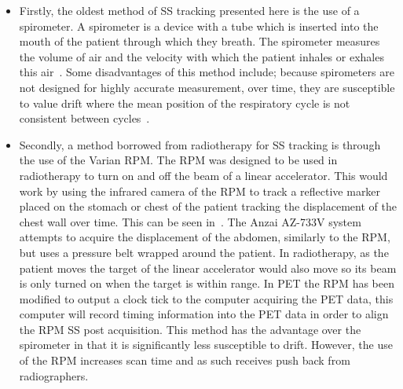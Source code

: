                 \begin{itemize}
                    \item Firstly, the oldest method of \gls{SS} tracking presented here is the use of a spirometer. A spirometer is a device with a tube which is inserted into the mouth of the patient through which they breath. The spirometer measures the volume of air and the velocity with which the patient inhales or exhales this air~. Some disadvantages of this method include; %
                    because spirometers are not designed for highly accurate measurement, over time, they are susceptible to value drift where the mean position of the respiratory cycle is not consistent between cycles~.
                    
                    \item Secondly, a method borrowed from radiotherapy for \gls{SS} tracking is through the use of the Varian \gls{RPM}. The \gls{RPM} was designed to be used in radiotherapy to turn on and off the beam of a linear accelerator. This would work by using the infrared camera of the \gls{RPM} to track a reflective marker placed on the stomach or chest of the patient tracking the displacement of the chest wall over time. This can be seen in~. The Anzai AZ-733V system attempts to acquire the displacement of the abdomen, similarly to the \gls{RPM}, but uses a pressure belt wrapped around the patient. In radiotherapy, as the patient moves the target of the linear accelerator would also move so its beam is only turned on when the target is within range. In \gls{PET} the \gls{RPM} has been modified to output a clock tick to the computer acquiring the \gls{PET} data, this computer will %
                    record timing information into the \gls{PET} data in order to align the \gls{RPM} \gls{SS} post acquisition. This method has the advantage over the spirometer in that it is significantly less susceptible to drift. However, the use of the \gls{RPM} increases scan time and as such receives push back from radiographers.
                    

\end{itemize}
